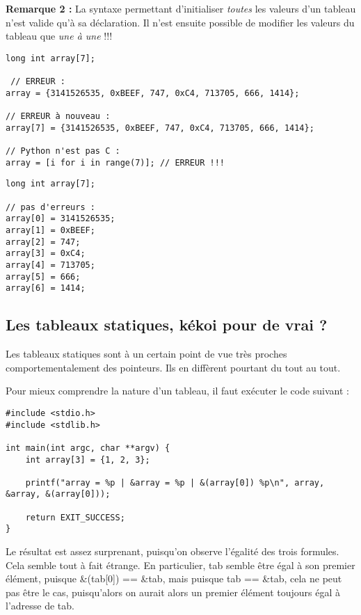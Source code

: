 \documentclass[../../../main.tex]{subfiles}
\begin{document}
\textbf{Remarque 2 :} La syntaxe permettant d'initialiser \textit{toutes} les valeurs d'un tableau n'est valide qu'à sa déclaration. Il n'est ensuite possible de modifier les valeurs du tableau que \textit{une à une} !!!  

\begin{minipage}{0.75\textwidth}
\begin{verbatim}
long int array[7];

 // ERREUR :
array = {3141526535, 0xBEEF, 747, 0xC4, 713705, 666, 1414};

// ERREUR à nouveau :
array[7] = {3141526535, 0xBEEF, 747, 0xC4, 713705, 666, 1414}; 

// Python n'est pas C :
array = [i for i in range(7)]; // ERREUR !!!
\end{verbatim}
\end{minipage}
\begin{minipage}{0.25\textwidth}
\begin{verbatim}
long int array[7];

// pas d'erreurs :
array[0] = 3141526535;
array[1] = 0xBEEF;
array[2] = 747;
array[3] = 0xC4;
array[4] = 713705;
array[5] = 666;
array[6] = 1414;
\end{verbatim}
\end{minipage}
\subsection{Les tableaux statiques, kékoi pour de vrai ?}
Les tableaux statiques sont à un certain point de vue très proches comportementalement des pointeurs. Ils en diffèrent pourtant du tout au tout.
 
Pour mieux comprendre la nature d'un tableau, il faut exécuter le code suivant :
\begin{verbatim}
#include <stdio.h>
#include <stdlib.h>

int main(int argc, char **argv) {
	int array[3] = {1, 2, 3};

	printf("array = %p | &array = %p | &(array[0]) %p\n", array, &array, &(array[0]));

	return EXIT_SUCCESS;
}
\end{verbatim}
Le résultat est assez surprenant, puisqu'on observe l'égalité des trois formules. Cela semble tout à fait étrange. En particulier, \textsf{tab} semble être égal à son premier élément, puisque \textsf{\&(tab[0]) == \&tab}, mais puisque \textsf{tab == \&tab}, cela ne peut pas être le cas, puisqu'alors on aurait alors un premier élément toujours égal à l'adresse de \textsf{tab}.
 
\end{document}

